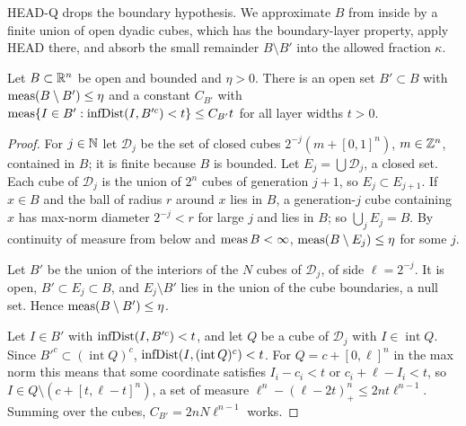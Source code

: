 HEAD-Q drops the boundary hypothesis. We approximate $B$ from inside by a finite union of open
dyadic cubes, which has the boundary-layer property, apply HEAD there, and absorb the small
remainder $B\setminus B'$ into the allowed fraction $\kappa$.

\begin{lemma}\label{bp:p4:dyadic-approx}
Let $B\subset\mathbb{R}^n$ be open and bounded and $\eta>0$. There is an open set $B'\subset B$ with
$\operatorname{meas}(B\setminus B')\le\eta$ and a constant $C_{B'}$ with
$\operatorname{meas}\{I\in B':\operatorname{infDist}(I,B'^c)<t\}\le C_{B'}t$ for all layer widths $t>0$.
\end{lemma}

\begin{proof}
\label{step:p4:dy-exhaust}
For $j\in\mathbb{N}$ let $\mathcal D_j$ be the set of closed cubes $2^{-j}(m+[0,1]^n)$, $m\in\mathbb{Z}^n$, contained
in $B$; it is finite because $B$ is bounded. Let $E_j=\bigcup\mathcal D_j$, a closed set. Each cube of
$\mathcal D_j$ is the union of $2^n$ cubes of generation $j+1$, so $E_j\subset E_{j+1}$. If $x\in B$
and the ball of radius $r$ around $x$ lies in $B$, a generation-$j$ cube containing $x$ has max-norm
diameter $2^{-j}<r$ for large $j$ and lies in $B$; so $\bigcup_jE_j=B$. By continuity of measure
from below and $\operatorname{meas} B<\infty$, $\operatorname{meas}(B\setminus E_j)\le\eta$ for some $j$.

\label{step:p4:dy-open}
Let $B'$ be the union of the interiors of the $N$ cubes of $\mathcal D_j$, of side $\ell=2^{-j}$.
It is open, $B'\subset E_j\subset B$, and $E_j\setminus B'$ lies in the union of the cube boundaries, a
null set. Hence $\operatorname{meas}(B\setminus B')\le\eta$.

\label{step:p4:dy-layer}
Let $I\in B'$ with $\operatorname{infDist}(I,B'^c)<t$, and let $Q$ be a cube of $\mathcal D_j$ with
$I\in\operatorname{int}Q$. Since $B'^c\subset(\operatorname{int}Q)^c$,
$\operatorname{infDist}(I,(\operatorname{int}Q)^c)<t$. For $Q=c+[0,\ell]^n$ in the max norm this means that some
coordinate satisfies $I_i-c_i<t$ or $c_i+\ell-I_i<t$, so $I\in Q\setminus(c+[t,\ell-t]^n)$,
a set of measure $\ell^n-(\ell-2t)_+^n\le2nt\ell^{n-1}$. Summing over the cubes,
$C_{B'}=2nN\ell^{n-1}$ works.
\end{proof}

